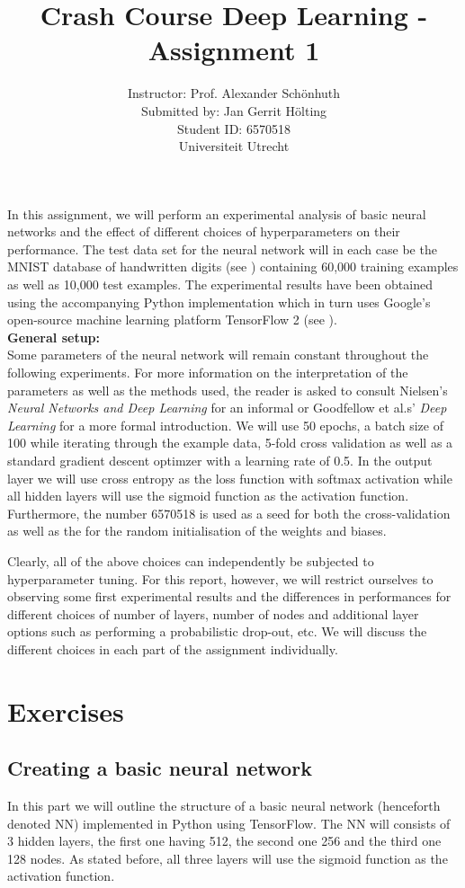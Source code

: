 \documentclass[12pt]{article}
\title {Crash Course Deep Learning - Assignment 1}
\author{Instructor:  Prof. Alexander Sch\"onhuth \\ Submitted by: Jan Gerrit H\"olting \\ Student ID: 6570518 \\ Universiteit Utrecht}
\date{}
\begin{document}
\maketitle

In this assignment, we will perform an experimental analysis of basic neural networks and the effect of different choices of hyperparameters on their performance. The test data set for the neural network will in each case be the MNIST database of handwritten digits (see \cite{MNIST}) containing 60,000 training examples as well as 10,000 test examples. The experimental results have been obtained using the accompanying Python implementation which in turn uses Google's open-source machine learning platform TensorFlow 2 (see \cite{TensorFlow}).\\

\noindent \textbf{General setup:} \\
Some parameters of the neural network will remain constant throughout the following experiments. For more information on the interpretation of the parameters as well as the methods used, the reader is asked to consult Nielsen's \textit{Neural Networks and Deep Learning} \cite{Nielsen} for an informal or Goodfellow et al.s' \textit{Deep Learning} \cite{Goodfellow} for a more formal introduction. We will use 50 epochs, a batch size of 100 while iterating through the example data, 5-fold cross validation as well as a standard gradient descent optimzer with a learning rate of 0.5. In the output layer we will use cross entropy as the loss function with softmax activation while all hidden layers will use the sigmoid function as the activation function. Furthermore, the number 6570518 is used as a seed for both the cross-validation as well as the for the random initialisation of the weights and biases.

Clearly, all of the above choices can independently be subjected to hyperparameter tuning. For this report, however, we will restrict ourselves to observing some first experimental results and the differences in performances for different choices of number of layers, number of nodes and additional layer options such as performing a probabilistic drop-out, etc. We will discuss the different choices in each part of the assignment individually. 

\section{Exercises}
\subsection{Creating a basic neural network}
In this part we will outline the structure of a basic neural network (henceforth denoted NN) implemented in Python using TensorFlow. The NN will consists of 3 hidden layers, the first one having 512, the second one 256 and the third one 128 nodes. As stated before, all three layers will use the sigmoid function as the activation function.
\end{document}
